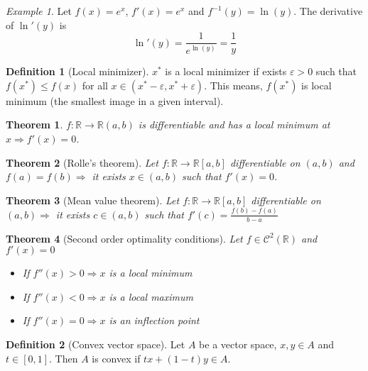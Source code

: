 \documentclass{article}
\newcommand{\Ar}{\Rightarrow}
\newcommand{\fOnR}[1]{#1 : \mathbb{R} \rightarrow \mathbb{R}}
\newcommand{\intcc}[1]{\left[#1\right]}
\newcommand{\intoo}[1]{\left(#1\right)}
\theoremstyle{definition}
\newtheorem{definition}{Definition}[section]
\theoremstyle{definition}
\theoremstyle{plain}
\newtheorem{theorem}{Theorem}[section]
\theoremstyle{plain}
\theoremstyle{plain}
\theoremstyle{plain}
\theoremstyle{definition}
\theoremstyle{remark}
\theoremstyle{remark}
\theoremstyle{remark}
\newtheorem{examplet}{Example}[theorem]
\theoremstyle{remark}
\newcommand{\R}{\mathbb{R}}
\newcommand{\C}{\mathcal{C}}
\newcommand{\E}{\varepsilon}
\begin{document}
\begin{examplet}
  Let $f(x) = e^x$, $f'(x) = e^x$ and $f^{-1}(y) = \ln(y)$. The derivative of $\ln'(y)$ is
  \[
  \ln'(y) = \frac{1}{e^{\ln(y)}} = \frac{1}{y}
  \]
\end{examplet}


\begin{definition}[Local minimizer]
  $x^*$ is a local minimizer if exists $\E > 0$ such that $f(x^*) \leq f(x)$ for all $x \in \intoo{x^*-\E, x^*+\E}$. This means, $f(x^*)$ is local minimum (the smallest image in a given interval).
\end{definition}


\begin{theorem}
  $\fOnR{f}{\intoo{a,b}}$ is differentiable and has a local minimum at $x \Ar f'(x) = 0$.
\end{theorem}



\begin{theorem}[Rolle's theorem]
  Let $\fOnR{f}{\intcc{a,b}}$ differentiable on $\intoo{a,b}$ and $f(a) = f(b) \Ar$ it exists $x \in \intoo{a,b}$ such that $f'(x) = 0$.
\end{theorem}



\begin{theorem}[Mean value theorem]
  Let $\fOnR{f}{\intcc{a,b}}$ differentiable on $\intoo{a,b} \Ar$ it exists $c \in \intoo{a,b}$ such that $f'(c) = \frac{f(b)-f(a)}{b-a}$
\end{theorem}



\begin{theorem}[Second order optimality conditions]
  Let $f \in \C^2(\R)$ and $f'(x) = 0$
  \begin{itemize}
  \item If $f''(x) > 0 \Ar x$ is a local minimum
  \item If $f''(x) < 0 \Ar x$ is a local maximum
  \item If $f''(x) = 0 \Ar x$ is an inflection point
  \end{itemize}
\end{theorem}



\begin{definition}[Convex vector space]
  Let $A$ be a vector space, $x,y \in A$ and $t \in \intcc{0,1}$. Then $A$ is convex if $tx + (1-t)y \in A$.
\end{definition}
\end{document}
